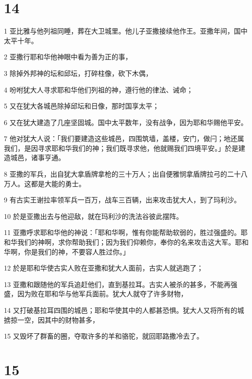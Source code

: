 \chapter{14}

\par 1 亚比雅与他列祖同睡，葬在大卫城里。他儿子亚撒接续他作王。亚撒年间，国中太平十年。
\par 2 亚撒行耶和华他神眼中看为善为正的事，
\par 3 除掉外邦神的坛和邱坛，打碎柱像，砍下木偶，
\par 4 吩咐犹大人寻求耶和华他们列祖的神，遵行他的律法、诫命；
\par 5 又在犹大各城邑除掉邱坛和日像，那时国享太平；
\par 6 又在犹大建造了几座坚固城。国中太平数年，没有战争，因为耶和华赐他平安。
\par 7 他对犹大人说：「我们要建造这些城邑，四围筑墙，盖楼，安门，做闩；地还属我们，是因寻求耶和华我们的神；我们既寻求他，他就赐我们四境平安。」於是建造城邑，诸事亨通。
\par 8 亚撒的军兵，出自犹大拿盾牌拿枪的三十万人；出自便雅悯拿盾牌拉弓的二十八万人。这都是大能的勇士。
\par 9 有古实王谢拉率领军兵一百万，战车三百辆，出来攻击犹大人，到了玛利沙。
\par 10 於是亚撒出去与他迎敌，就在玛利沙的洗法谷彼此摆阵。
\par 11 亚撒呼求耶和华他的神说：「耶和华啊，惟有你能帮助软弱的，胜过强盛的。耶和华我们的神啊，求你帮助我们；因为我们仰赖你，奉你的名来攻击这大军。耶和华啊，你是我们的神，不要容人胜过你。」
\par 12 於是耶和华使古实人败在亚撒和犹大人面前，古实人就逃跑了；
\par 13 亚撒和跟随他的军兵追赶他们，直到基拉耳。古实人被杀的甚多，不能再强盛，因为败在耶和华与他军兵面前。犹大人就夺了许多财物，
\par 14 又打破基拉耳四围的城邑；耶和华使其中的人都甚恐惧。犹大人又将所有的城掳掠一空，因其中的财物甚多，
\par 15 又毁坏了群畜的圈，夺取许多的羊和骆驼，就回耶路撒冷去了。

\chapter{15}

